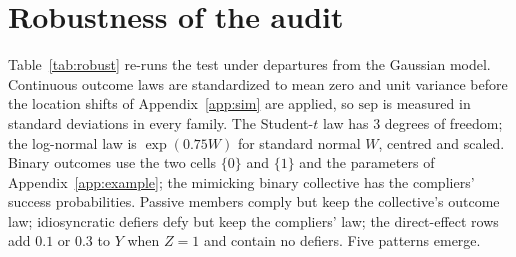 \documentclass{article}
\theoremstyle{remark}
\newcommand{\Prob}{\mathbb{P}}
\begin{document}
\section{Robustness of the audit}\label{app:robust}

\begin{table}[h]
\centering
\caption{Rejection rates of the moment-inequality test when the data depart from the Gaussian model of Section~\ref{sec:exp}. FS is the first stage. Unless stated, $\alpha=0.10$, $\Prob(T=c)=0.30$, $\Prob(T=a)=0.25$, $\tau_c=\tau_f=1$, and $12$ cells; $\Prob(T{=}f)$ is total defier mass. Participation rows recruit $0.10$ and split it into active defiers and passive compliers ($0.08/0.02$ and $0.05/0.05$). Rejection rates use $400$ replications (Monte Carlo standard error at most $0.025$) and seeds different from Figure~\ref{fig:main}.}
\label{tab:robust}
\footnotesize
\setlength{\tabcolsep}{3.5pt}
\resizebox{\textwidth}{!}{}
\end{table}

Table~\ref{tab:robust} re-runs the test under departures from the Gaussian model. Continuous outcome laws are standardized to mean zero and unit variance before the location shifts of Appendix~\ref{app:sim} are applied, so $\mathrm{sep}$ is measured in standard deviations in every family. The Student-$t$ law has $3$ degrees of freedom; the log-normal law is $\exp(0.75W)$ for standard normal $W$, centred and scaled. Binary outcomes use the two cells $\{0\}$ and $\{1\}$ and the parameters of Appendix~\ref{app:example}; the mimicking binary collective has the compliers' success probabilities. Passive members comply but keep the collective's outcome law; idiosyncratic defiers defy but keep the compliers' law; the direct-effect rows add $0.1$ or $0.3$ to $Y$ when $Z=1$ and contain no defiers. Five patterns emerge.
\end{document}
